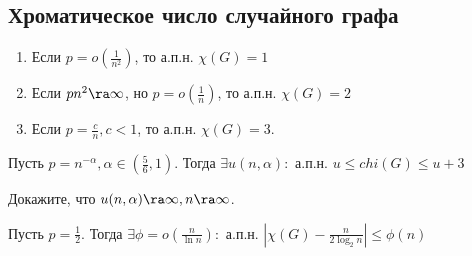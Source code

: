 \subsection{Хроматическое число случайного графа}
\begin{theorem}
    \begin{enumerate}
        \item Если \(p = o\left( \frac{1}{n^2} \right)\), то а.п.н. \(\chi(G) = 1\)
        \item Если \(pn^2 \ra \infty\), но \(p = o\left( \frac{1}{n} \right)\), то а.п.н. \(\chi(G) = 2\)
        \item Если \(p = \frac{c}{n}, c < 1\), то а.п.н. \(\chi(G) = 3\).
    \end{enumerate}
\end{theorem}

\begin{theorem}[Боллобаш]
    Пусть \(p = n^{-\alpha}, \alpha \in \left( \frac{5}{6}, 1 \right)\). Тогда \(\exists u(n, \alpha):\) а.п.н. \(u \le chi(G) \le u + 3\)
\end{theorem}

\begin{exercise}
    Докажите, что \(u(n, \alpha) \ra \infty, n \ra \infty\).
\end{exercise}

\begin{theorem}[Боллобаш]
    Пусть \(p = \frac{1}{2}\). Тогда \(\exists \phi = o\left( \frac{n}{\ln n} \right):\) а.п.н. \(\left| \chi(G) - \frac{n}{2\log_2 n} \right| \le \phi(n)\)
\end{theorem}
